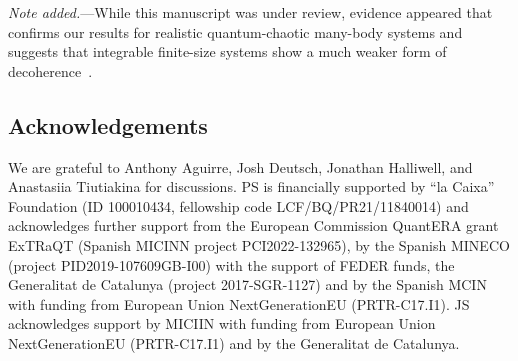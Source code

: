 \documentclass[pre,onecolumn,12pt,aps,longbibliography,nofootinbib]{revtex4-2}
\newcommand{\blue}[1]{#1}
\begin{document}
\blue{\emph{Note added.}---While this manuscript was under review, evidence appeared that confirms our results for realistic quantum-chaotic many-body systems and suggests that integrable finite-size systems show a much weaker form of decoherence~\cite{WangStrasbergArXiv2024}.}


\subsection*{Acknowledgements}

We are grateful to Anthony Aguirre, Josh Deutsch, Jonathan Halliwell, and Anastasiia Tiutiakina for discussions.
PS is financially supported by ``la Caixa'' Foundation (ID 100010434, fellowship code LCF/BQ/PR21/11840014)
and acknowledges further support from the European Commission QuantERA grant ExTRaQT (Spanish MICINN project
PCI2022-132965), by the Spanish MINECO (project PID2019-107609GB-I00) with the support of FEDER funds, the Generalitat
de Catalunya (project 2017-SGR-1127) and by the Spanish MCIN with funding from European Union NextGenerationEU
(PRTR-C17.I1). JS acknowledges support by MICIIN with funding from European Union NextGenerationEU (PRTR-C17.I1) and
by the Generalitat de Catalunya.



\end{document}
